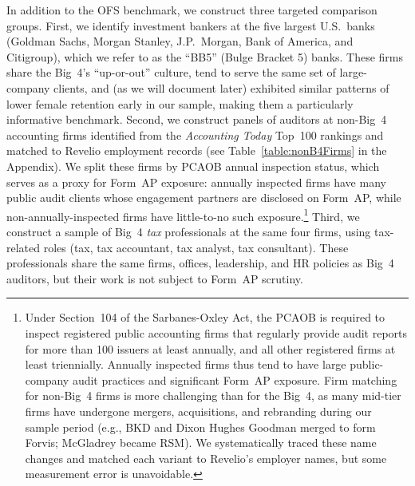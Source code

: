 \documentclass[11pt]{article}
\begin{document}
        In addition to the OFS benchmark, we construct three targeted comparison groups. First, we identify investment bankers at the five largest U.S.\ banks (Goldman Sachs, Morgan Stanley, J.P.\ Morgan, Bank of America, and Citigroup), which we refer to as the ``BB5'' (Bulge Bracket 5) banks. These firms share the Big~4's ``up-or-out'' culture, tend to serve the same set of large-company clients, and (as we will document later) exhibited similar patterns of lower female retention early in our sample, making them a particularly informative benchmark. Second, we construct panels of auditors at non-Big~4 accounting firms identified from the \textit{Accounting Today} Top~100 rankings and matched to Revelio employment records (see Table~\ref{table:nonB4Firms} in the Appendix). We split these firms by PCAOB annual inspection status, which serves as a proxy for Form~AP exposure: annually inspected firms have many public audit clients whose engagement partners are disclosed on Form~AP, while non-annually-inspected firms have little-to-no such exposure.\footnote{Under Section~104 of the Sarbanes-Oxley Act, the PCAOB is required to inspect registered public accounting firms that regularly provide audit reports for more than 100 issuers at least annually, and all other registered firms at least triennially. Annually inspected firms thus tend to have large public-company audit practices and significant Form~AP exposure. Firm matching for non-Big~4 firms is more challenging than for the Big~4, as many mid-tier firms have undergone mergers, acquisitions, and rebranding during our sample period (e.g., BKD and Dixon Hughes Goodman merged to form Forvis; McGladrey became RSM). We systematically traced these name changes and matched each variant to Revelio's employer names, but some measurement error is unavoidable.} Third, we construct a sample of Big~4 \textit{tax} professionals at the same four firms, using tax-related roles (tax, tax accountant, tax analyst, tax consultant). These professionals share the same firms, offices, leadership, and HR policies as Big~4 auditors, but their work is not subject to Form~AP scrutiny.
\end{document}
